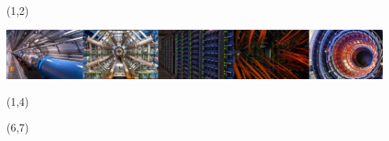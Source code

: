 \documentclass[final]{beamer}
\begin{document}
\begin{frame}{} 




\begin{textblock}{84.0}(1,2)
\begin{center}
\includegraphics[width=0.95\textwidth]{images/s2i2-banner.jpg}
\end{center}
\end{textblock}

\begin{textblock}{84.0}(1,4)
\begin{center}
\begin{huge}
\color{white}{
S2I2-HEP - Conceptualization of an S2I2 Institute for High Energy Physics
}
\end{huge}
\end{center}
\end{textblock}

\begin{textblock}{84.0}(6,7)
\begin{center}
\begin{LARGE}
\color{white}{
PIs: Peter Elmer (Princeton U.), Mark Neubauer (U.Illinois Urbana-Champaign), \\ Mike Sokoloff (U.Cincinnati)
}
\end{LARGE}
\end{center}
\end{textblock}


\end{frame}
\end{document}
